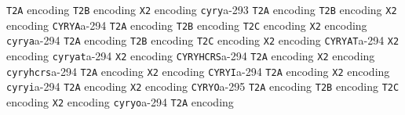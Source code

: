 \documentclass[twoside]{ltxdoc}
\makeatletter
\renewenvironment{theindex}{%
   \@restonecoltrue
   \if@twocolumn\@restonecolfalse\fi
   \columnseprule \z@
   \columnsep 35\p@
   \twocolumn[\index@prologue]%
   \IndexParms
   \let\item\@idxitem
   \ignorespaces
}{\if@restonecol\onecolumn\else\clearpage\fi}
\makeatother
\begin{document}
\begin{theindex}
    \subitem \texttt  {T2A} encoding\pfill {}
    \subitem \texttt  {T2B} encoding\pfill {}
    \subitem \texttt  {X2} encoding\pfill {}
  \item \texttt  {cyry}\pfill a-293
    \subitem \texttt  {T2A} encoding\pfill {}
    \subitem \texttt  {T2B} encoding\pfill {}
    \subitem \texttt  {X2} encoding\pfill {}
  \item \texttt  {CYRYA}\pfill a-294
    \subitem \texttt  {T2A} encoding\pfill {}
    \subitem \texttt  {T2B} encoding\pfill {}
    \subitem \texttt  {T2C} encoding\pfill {}
    \subitem \texttt  {X2} encoding\pfill {}
  \item \texttt  {cyrya}\pfill a-294
    \subitem \texttt  {T2A} encoding\pfill {}
    \subitem \texttt  {T2B} encoding\pfill {}
    \subitem \texttt  {T2C} encoding\pfill {}
    \subitem \texttt  {X2} encoding\pfill {}
  \item \texttt  {CYRYAT}\pfill a-294
    \subitem \texttt  {X2} encoding\pfill {}
  \item \texttt  {cyryat}\pfill a-294
    \subitem \texttt  {X2} encoding\pfill {}
  \item \texttt  {CYRYHCRS}\pfill a-294
    \subitem \texttt  {T2A} encoding\pfill {}
    \subitem \texttt  {X2} encoding\pfill {}
  \item \texttt  {cyryhcrs}\pfill a-294
    \subitem \texttt  {T2A} encoding\pfill {}
    \subitem \texttt  {X2} encoding\pfill {}
  \item \texttt  {CYRYI}\pfill a-294
    \subitem \texttt  {T2A} encoding\pfill {}
    \subitem \texttt  {X2} encoding\pfill {}
  \item \texttt  {cyryi}\pfill a-294
    \subitem \texttt  {T2A} encoding\pfill {}
    \subitem \texttt  {X2} encoding\pfill {}
  \item \texttt  {CYRYO}\pfill a-295
    \subitem \texttt  {T2A} encoding\pfill {}
    \subitem \texttt  {T2B} encoding\pfill {}
    \subitem \texttt  {T2C} encoding\pfill {}
    \subitem \texttt  {X2} encoding\pfill {}
  \item \texttt  {cyryo}\pfill a-294
    \subitem \texttt  {T2A} encoding\pfill {}

\end{theindex}
\end{document}
